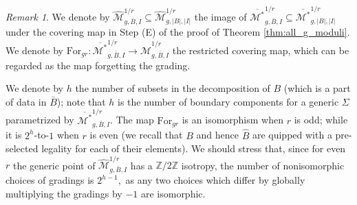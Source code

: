 \documentclass[11pt,a4paper]{article}
\theoremstyle{definition}
\theoremstyle{remark}
\newtheorem{rmk}[dummy]{Remark}
\numberwithin{equation}{section}
\def\Mbarstar{{\overline{\mathcal M^*}}}
\begin{document}
\begin{rmk}
    We denote by $\widehat{\mathcal{M}}_{g,\bar{B},I}^{1/r}\subseteq \widehat{\mathcal{M}}_{g,\lvert B \rvert,\lvert I \rvert}^{1/r}$ the image of ${\Mbarstar}_{g,\bar{B},I}^{1/r}\subseteq {\Mbarstar}_{g,\lvert B \rvert,\lvert I \rvert}^{1/r}$ under the covering map in Step (E) of the proof of Theorem \ref{thm:all_g_moduli}. We denote by $\text{For}_{gr}\colon {\Mbarstar}_{g,\bar{B},I}^{1/r}\to \widehat{\mathcal{M}}_{g,\bar{B},I}^{1/r}$ the restricted covering map, which can be regarded as the map forgetting the grading.
    
    We denote by $h$ the number of subsets in the decomposition of $B$ (which is a part of data in $\bar{B}$); note that $h$ is the number of boundary components for a generic $\Sigma$ parametrized by ${\Mbarstar}_{g,\bar{B},I}^{1/r}$.  The map $\text{For}_{gr}$ is an isomorphism when $r$ is odd; while it is $2^h$-to-$1$ when $r$ is even (we recall that $B$ and hence $\hat B$ are quipped with a pre-selected legality for each of their elements). 
    We should stress that, since for even $r$ the generic point of $\widehat{\mathcal{M}}_{g,\bar{B},I}^{1/r}$ has a ${\mathbb{Z}}/2{\mathbb{Z}}$ isotropy, the number of nonisomorphic choices of gradings is $2^{h-1},$ as any two choices which differ by globally multiplying the gradings by $-1$ are isomorphic.
    
   

\end{rmk}
\end{document}
